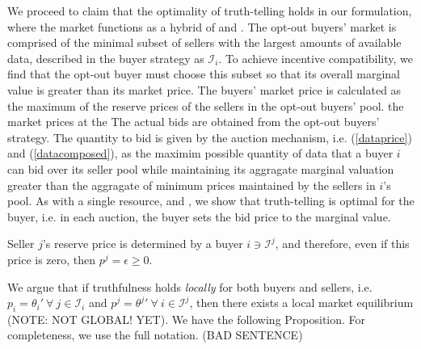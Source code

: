 \documentclass[12pt]{article}
\theoremstyle{definition}
\newcommand{\mcI}{\mathcal{I}}
\begin{document}
\begin{multicols}{2}
We proceed to claim that the optimality of truth-telling holds in our
formulation, where the market functions as a hybrid of \cite{semret} and
\cite{zheng}. The opt-out buyers' market is comprised of the minimal subset of
sellers with the largest amounts of available data, described in the buyer strategy as $\mcI_i$.
To achieve incentive compatibility, we find that the opt-out buyer must choose this subset so that
its overall marginal value is greater than its market price.
The buyers' market price is calculated as the maximum of the reserve prices
of the sellers in the opt-out buyers' pool.
the market prices at the %
The actual bids are
obtained from the opt-out buyers' strategy. The quantity to bid is given
by the auction mechanism, i.e. (\ref{dataprice}) and (\ref{datacomposed}), as
the maximim possible quantity of data that a buyer $i$ can bid over its seller
pool while maintaining its aggragate marginal valuation greater than the aggragate of
minimum prices maintained by the sellers in $i$'s pool.
As with a single resource, \cite{semret} and
\cite{lazar}, we show that truth-telling is optimal for the buyer, i.e. in each auction, the buyer sets
the bid price to the marginal value.

Seller $j$'s reserve price is determined by a
buyer $i \ni \mcI^j$, and therefore, even if this price is zero,
then $p^j = \epsilon \ge 0$.

We argue that if truthfulness holds \emph{locally} for both buyers and sellers, i.e. $p_i ={\theta_i}' \
\forall \ j \in \mcI_i$ and $p^j = {\theta^j}' \ \forall \ i \in\mcI^j$, then
there exists a local market
equilibrium (NOTE: NOT GLOBAL! YET). We have the following Proposition. For
completeness, we use the full notation. (BAD SENTENCE)


\end{multicols}
\end{document}
